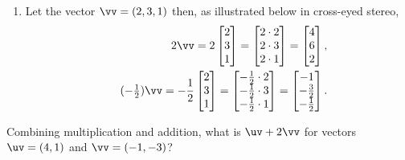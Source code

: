 \begin{example}
\begin{enumerate}
\item Let the vector \(\vv=(2,3,1)\) then, as illustrated below in cross-eyed stereo,
\begin{eqnarray*}&&
2\vv=2\begin{bmatrix} 2\\3\\1 \end{bmatrix}
=\begin{bmatrix} 2\cdot2\\2\cdot3\\2\cdot1 \end{bmatrix}
=\begin{bmatrix} 4\\6\\2 \end{bmatrix},
\\&& 
(-\tfrac12)\vv=-\frac12\begin{bmatrix} 2\\3\\1 \end{bmatrix}
=\begin{bmatrix} -\frac12\cdot2\\-\frac12\cdot3\\-\frac12\cdot1 \end{bmatrix}
=\begin{bmatrix} -1\\-\frac32\\-\frac12 \end{bmatrix}. 
\end{eqnarray*}
\begin{center}
\end{center}
\end{enumerate}
\end{example}



\begin{activity}
Combining multiplication and addition, what is \(\uv+2\vv\) for vectors \(\uv=(4,1)\) and \(\vv=(-1,-3)\)?
\end{activity}



